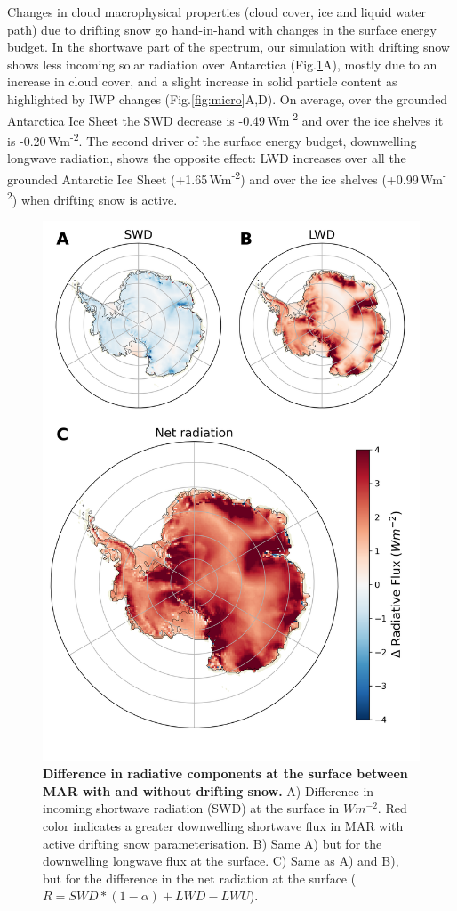 \documentclass[draft]{agujournal2019}
\begin{document}
Changes in cloud macrophysical properties (cloud cover, ice and liquid water path) due to drifting snow go hand-in-hand with changes in the surface energy budget. In the shortwave part of the spectrum, our simulation with drifting snow shows less incoming solar radiation over Antarctica (Fig.\ref{fig:SEB}A), mostly due to an increase in cloud cover, and a slight increase in solid particle content as highlighted by IWP changes (Fig.\ref{fig:micro}A,D). On average, over the grounded Antarctica Ice Sheet the SWD decrease is -0.49\,Wm\textsuperscript{-2} and over the ice shelves it is -0.20\,Wm\textsuperscript{-2}. The second driver of the surface energy budget, downwelling longwave radiation, shows the opposite effect: LWD increases over all the grounded Antarctic Ice Sheet (+1.65\,Wm\textsuperscript{-2}) and over the ice shelves (+0.99\,Wm\textsuperscript{-2}) when drifting snow is active.

\begin{figure}[H]
	\includegraphics[scale=0.65]{SEB.png}
	\caption{\textbf{Difference in radiative components at the surface between MAR with and without drifting snow.} A) Difference in incoming shortwave radiation (SWD) at the surface in $Wm^{-2}$. Red color indicates a greater downwelling shortwave flux in MAR with active drifting snow parameterisation. B) Same A) but for the downwelling longwave flux at the surface. C) Same as A) and B), but for the difference in the net radiation at the surface ($R= SWD * (1 - \alpha) + LWD - LWU$).}
	\label{fig:SEB}
\end{figure}
\end{document}
